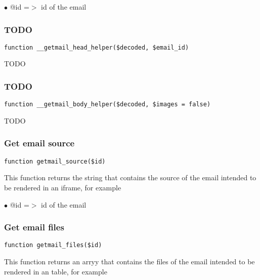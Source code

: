 \documentclass[a4paper]{article}
\begin{document}
\begin{compactitem}
\item[\color{myblue}$\bullet$] @id =$>$ id of the email
\end{compactitem}

\hypertarget{toc94}{}
\subsubsection{TODO}

\begin{lstlisting}
function __getmail_head_helper($decoded, $email_id)
\end{lstlisting}

TODO

\hypertarget{toc95}{}
\subsubsection{TODO}

\begin{lstlisting}
function __getmail_body_helper($decoded, $images = false)
\end{lstlisting}

TODO

\hypertarget{toc96}{}
\subsubsection{Get email source}

\begin{lstlisting}
function getmail_source($id)
\end{lstlisting}

This function returns the string that contains the source of the email
intended to be rendered in an iframe, for example

\begin{compactitem}
\item[\color{myblue}$\bullet$] @id =$>$ id of the email
\end{compactitem}

\hypertarget{toc97}{}
\subsubsection{Get email files}

\begin{lstlisting}
function getmail_files($id)
\end{lstlisting}

This function returns an arryy that contains the files of the email
intended to be rendered in an table, for example
\end{document}
